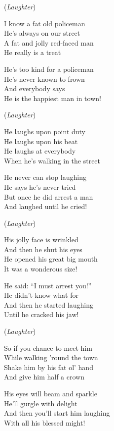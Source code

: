 \vspace{10pt}
(\textit{Laughter})\par
\vspace{10pt}
I know a fat old policeman\\
He's always on our street\\
A fat and jolly red-faced man\\
He really is a treat\par
\vspace{10pt}
He's too kind for a policeman\\
He's never known to frown\\
And everybody says\\
He is the happiest man in town!\par
\vspace{10pt}
(\textit{Laughter})\par
\vspace{10pt}
He laughs upon point duty\\
He laughs upon his beat\\
He laughs at everybody\\
When he's walking in the street\par
\vspace{10pt}
He never can stop laughing\\
He says he's never tried\\
But once he did arrest a man\\
And laughed until he cried!\par
\vspace{10pt}
(\textit{Laughter})\par
\vspace{10pt}
His jolly face is wrinkled\\
And then he shut his eyes\\
He opened his great big mouth\\
It was a wonderous size!\par
\vspace{10pt}
He said: ``I must arrest you!''\\
He didn't know what for\\
And then he started laughing\\
Until he cracked his jaw!\par
\vspace{10pt}
(\textit{Laughter})\par
\vspace{10pt}
So if you chance to meet him\\
While walking 'round the town\\
Shake him by his fat ol' hand\\
And give him half a crown\par
\vspace{10pt}
His eyes will beam and sparkle\\
He'll gurgle with delight\\
And then you'll start him laughing\\
With all his blessed might!
